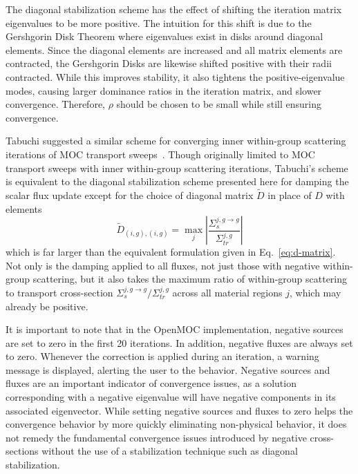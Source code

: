 
The diagonal stabilization scheme has the effect of shifting the iteration matrix eigenvalues to be more positive. The intuition for this shift is due to the Gershgorin Disk Theorem where eigenvalues exist in disks around diagonal elements. Since the diagonal elements are increased and all matrix elements are contracted, the Gershgorin Disks are likewise shifted positive with their radii contracted. While this improves stability, it also tightens the positive-eigenvalue modes, causing larger dominance ratios in the iteration matrix, and slower convergence. Therefore, $\rho$ should be chosen to be small while still ensuring convergence. 

Tabuchi suggested a similar scheme for converging inner within-group scattering iterations of \ac{MOC} transport sweeps~\cite{ty-solution}. Though originally limited to \ac{MOC} transport sweeps with inner within-group scattering iterations, Tabuchi's scheme is equivalent to the diagonal stabilization scheme presented here for damping the scalar flux update except for the choice of diagonal matrix $\tilde{D}$ in place of $D$ with elements
\begin{equation}
\tilde{D}_{(i,g), (i,g)} = \max_j \left|\frac{\Sigma_{s}^{j, g \rightarrow g}}{\Sigma_{\textit{tr}}^{j, g}} \right|
\end{equation}
which is far larger than the equivalent formulation given in Eq.~\ref{eq:d-matrix}. Not only is the damping applied to all fluxes, not just those with negative within-group scattering, but it also takes the maximum ratio of within-group scattering to transport cross-section $\Sigma_{s}^{j,g \rightarrow g} / \Sigma_{\textit{tr}}^{j, g}$ across all material regions $j$, which may already be positive.

It is important to note that in the OpenMOC implementation, negative sources are set to zero in the first 20 iterations. In addition, negative fluxes are always set to zero. Whenever the correction is applied during an iteration, a warning message is displayed, alerting the user to the behavior. Negative sources and fluxes are an important indicator of convergence issues, as a solution corresponding with a negative eigenvalue will have negative components in its associated eigenvector. While setting negative sources and fluxes to zero helps the convergence behavior by more quickly eliminating non-physical behavior, it does not remedy the fundamental convergence issues introduced by negative cross-sections without the use of a stabilization technique such as diagonal stabilization.

